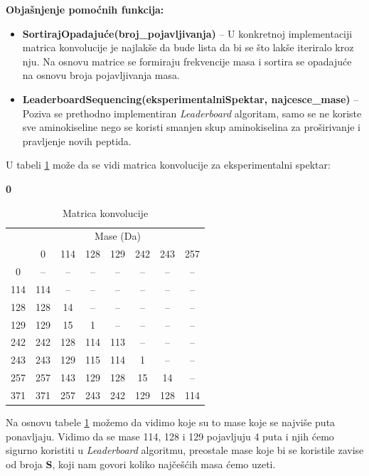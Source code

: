 \documentclass[12pt,oneside]{memoir}
\begin{document}
\noindent
\textbf{Objašnjenje pomoćnih funkcija:}
\begin{itemize}
    \item \textbf{SortirajOpadajuće(broj\_pojavljivanja)} – U konkretnoj implementaciji matrica konvolucije je najlakše da bude lista da bi se što lakše iteriralo kroz nju. Na osnovu matrice se formiraju frekvencije masa i sortira se opadajuće na osnovu broja pojavljivanja masa.
    \item \textbf{LeaderboardSequencing(eksperimentalniSpektar, najcesce\_mase)} – Poziva se prethodno implementiran \emph{Leaderboard} algoritam, samo se ne koriste sve aminokiseline nego se koristi smanjen skup aminokiselina za proširivanje i pravljenje novih peptida.
\end{itemize}

U tabeli \ref{tab:convolution_matrix} može da se vidi matrica konvolucije za eksperimentalni spektar:
\begin{center}
{\bfseries 0       }
\end{center}

\begin{table}[h]
\centering
\renewcommand{\arraystretch}{1.3}
\begin{tabular}{|c|c|c|c|c|c|c|c|}
\hline
\multirow{2}{*}{} & \multicolumn{7}{c|}{Mase (Da)} \\ \cline{2-8}
 & 0 & 114 & 128 & 129 & 242 & 243 & 257 \\ \hline
0 & -- & -- & -- & -- & -- & -- & -- \\ \hline
114 & 114 & -- & -- & -- & -- & -- & -- \\ \hline
128 & 128 & 14 & -- & -- & -- & -- & -- \\ \hline
129 & 129 & 15 & 1 & -- & -- & -- & -- \\ \hline
242 & 242 & 128 & 114 & 113 & -- & -- & -- \\ \hline
243 & 243 & 129 & 115 & 114 & 1 & -- & -- \\ \hline
257 & 257 & 143 & 129 & 128 & 15 & 14 & -- \\ \hline
371 & 371 & 257 & 243 & 242 & 129 & 128 & 114 \\ \hline
\end{tabular}
\caption{Matrica konvolucije}
\label{tab:convolution_matrix}
\end{table}

Na osnovu tabele \ref{tab:convolution_matrix} možemo da vidimo koje su to mase koje se najviše puta ponavljaju. Vidimo da se mase 114, 128 i 129 pojavljuju 4 puta i njih ćemo sigurno koristiti u \emph{Leaderboard} algoritmu, preostale mase koje bi se koristile zavise od broja \textbf{S}, koji nam govori koliko najčešćih masa ćemo uzeti.
\end{document}
